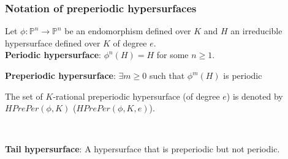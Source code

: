 \documentclass{beamer}
\def\jump{ \quad \\ \vspace{0.5cm} \pause}
\theoremstyle{thmstyle}
\theoremstyle{mystyle}
\theoremstyle{qstnstyle}
\begin{document}


\begin{frame}
\frametitle{Notation of preperiodic hypersurfaces}

Let $\phi:\mathbb{P}^n\to\mathbb{P}^n$ be an endomorphism defined over $K$ and $H$ an irreducible hypersurface defined over $K$ of degree $e$.
\jump
\textbf{Periodic hypersurface}: $\phi^n(H)=H$ for some $n\geq{1}$.
%
%
\jump

\textbf{Preperiodic hypersurface}: $\exists m\geq{0}$ such that $\phi^m(H)$
is periodic 

\vspace{2mm}
The set of $K$-rational preperiodic hypersurface (of degree $e$) is denoted by $HPrePer(\phi,K)$ ($HPrePer(\phi,K,e)$).

\jump

\textbf{Tail hypersurface}: A hypersurface that is preperiodic but not periodic.

%
\end{frame}
\end{document}
